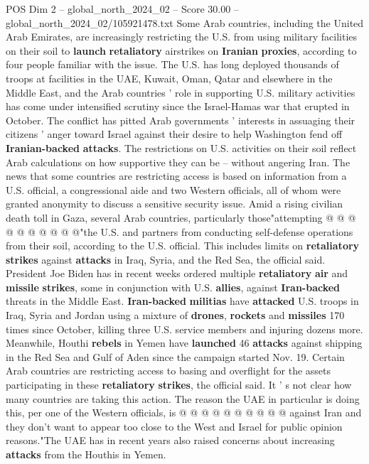 \begin{textsample}{POS Dim 2 – global\_north\_2024\_02 – Score 30.00 – global\_north\_2024\_02/105921478.txt}  \label{ex:f2_pos_261}
Some Arab countries, including the United Arab Emirates, are increasingly restricting the U.S. from using military facilities on their soil to \textbf{launch} \textbf{retaliatory} airstrikes on \textbf{Iranian} \textbf{proxies}, according to four people familiar with the issue.
The U.S. has long deployed thousands of troops at facilities in the UAE, Kuwait, Oman, Qatar and elsewhere in the Middle East, and the Arab countries ' role in supporting U.S. military activities has come under intensified scrutiny since the Israel-Hamas war that erupted in October.
The conflict has pitted Arab governments ' interests in assuaging their citizens ' anger toward Israel against their desire to help Washington fend off \textbf{Iranian-backed} \textbf{attacks}.
The restrictions on U.S. activities on their soil reflect Arab calculations on how supportive they can be -- without angering Iran.
The news that some countries are restricting access is based on information from a U.S. official, a congressional aide and two Western officials, all of whom were granted anonymity to discuss a sensitive security issue.
Amid a rising civilian death toll in Gaza, several Arab countries, particularly those"attempting @ @ @ @ @ @ @ @ @ @"the U.S. and partners from conducting self-defense operations from their soil, according to the U.S. official.
This includes limits on \textbf{retaliatory} \textbf{strikes} against \textbf{attacks} in Iraq, Syria, and the Red Sea, the official said.
President Joe Biden has in recent weeks ordered multiple \textbf{retaliatory} \textbf{air} and \textbf{missile} \textbf{strikes}, some in conjunction with U.S. \textbf{allies}, against \textbf{Iran-backed} threats in the Middle East. \textbf{Iran-backed} \textbf{militias} have \textbf{attacked} U.S. troops in Iraq, Syria and Jordan using a mixture of \textbf{drones}, \textbf{rockets} and \textbf{missiles} 170 times since October, killing three U.S. service members and injuring dozens more.
Meanwhile, Houthi \textbf{rebels} in Yemen have \textbf{launched} 46 \textbf{attacks} against shipping in the Red Sea and Gulf of Aden since the campaign started Nov. 19.
Certain Arab countries are restricting access to basing and overflight for the assets participating in these \textbf{retaliatory} \textbf{strikes}, the official said.
It ' s not clear how many countries are taking this action.
The reason the UAE in particular is doing this, per one of the Western officials, is @ @ @ @ @ @ @ @ @ @ against Iran and they don't want to appear too close to the West and Israel for public opinion reasons."The UAE has in recent years also raised concerns about increasing \textbf{attacks} from the Houthis in Yemen.

\end{textsample}
